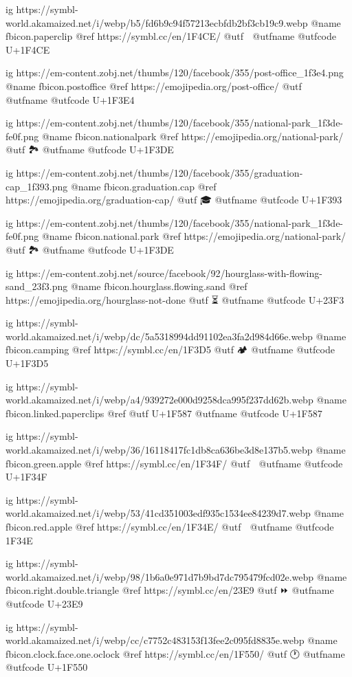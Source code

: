 	ig https://symbl-world.akamaized.net/i/webp/b5/fd6b9c94f57213ecbfdb2bf3cb19c9.webp
	@name fbicon.paperclip
	@ref https://symbl.cc/en/1F4CE/
	@utf 📎
	@utfname
	@utfcode U+1F4CE

	ig https://em-content.zobj.net/thumbs/120/facebook/355/post-office_1f3e4.png
	@name fbicon.postoffice
	@ref https://emojipedia.org/post-office/
	@utf 🏤
	@utfname
	@utfcode U+1F3E4

 	ig https://em-content.zobj.net/thumbs/120/facebook/355/national-park_1f3de-fe0f.png
 	@name fbicon.nationalpark
 	@ref https://emojipedia.org/national-park/
 	@utf 🏞️
 	@utfname
 	@utfcode U+1F3DE

	ig https://em-content.zobj.net/thumbs/120/facebook/355/graduation-cap_1f393.png
	@name fbicon.graduation.cap
	@ref https://emojipedia.org/graduation-cap/
	@utf 🎓
	@utfname
	@utfcode U+1F393

	ig https://em-content.zobj.net/thumbs/120/facebook/355/national-park_1f3de-fe0f.png
	@name fbicon.national.park
	@ref https://emojipedia.org/national-park/
	@utf 🏞
	@utfname
	@utfcode U+1F3DE

	ig https://em-content.zobj.net/source/facebook/92/hourglass-with-flowing-sand_23f3.png
	@name fbicon.hourglass.flowing.sand
	@ref https://emojipedia.org/hourglass-not-done
	@utf ⏳
	@utfname
	@utfcode U+23F3

	ig https://symbl-world.akamaized.net/i/webp/dc/5a5318994dd91102ea3fa2d984d66e.webp
	@name fbicon.camping
	@ref https://symbl.cc/en/1F3D5
	@utf 🏕
	@utfname
	@utfcode U+1F3D5

	ig https://symbl-world.akamaized.net/i/webp/a4/939272e000d9258dca995f237dd62b.webp
	@name fbicon.linked.paperclips
	@ref
	@utf U+1F587
	@utfname
	@utfcode U+1F587

	ig https://symbl-world.akamaized.net/i/webp/36/16118417fc1db8ca636be3d8e137b5.webp
	@name fbicon.green.apple
	@ref https://symbl.cc/en/1F34F/
	@utf 🍏
	@utfname
	@utfcode U+1F34F

	ig https://symbl-world.akamaized.net/i/webp/53/41cd351003edf935c1534ee84239d7.webp
	@name fbicon.red.apple
	@ref https://symbl.cc/en/1F34E/
	@utf 🍎
	@utfname
	@utfcode 1F34E

	ig https://symbl-world.akamaized.net/i/webp/98/1b6a0e971d7b9bd7dc795479fcd02e.webp
	@name fbicon.right.double.triangle
	@ref https://symbl.cc/en/23E9
	@utf ⏩
	@utfname
	@utfcode U+23E9

	ig https://symbl-world.akamaized.net/i/webp/cc/c7752c483153f13fee2c095fd8835e.webp
	@name fbicon.clock.face.one.oclock
	@ref https://symbl.cc/en/1F550/
	@utf 🕐
	@utfname
	@utfcode U+1F550

